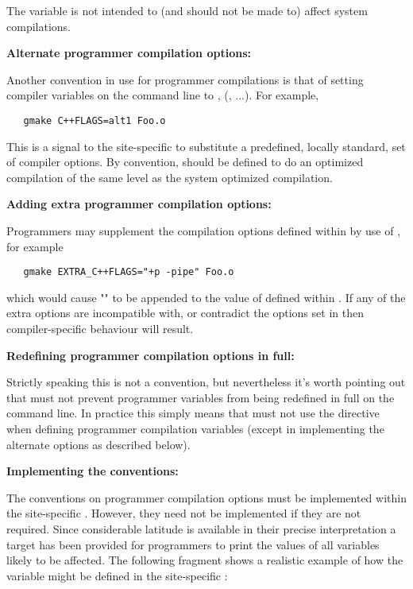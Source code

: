 The  variable is not intended to (and should not be made to) affect
system compilations.
 
\textbf{Alternate programmer compilation options:}
 
Another convention in use for programmer compilations is that of setting
compiler  variables on the command line to ,
(, ...).  For example,
 
\begin{verbatim}
   gmake C++FLAGS=alt1 Foo.o
\end{verbatim}
 
\noindent
This is a signal to the site-specific  to substitute a
predefined, locally standard, set of compiler options.  By convention,
 should be defined to do an optimized compilation of the same level
as the system optimized compilation.
 
\textbf{Adding extra programmer compilation options:}
 
Programmers may supplement the compilation options defined within
 by use of , for example
 
\begin{verbatim}
   gmake EXTRA_C++FLAGS="+p -pipe" Foo.o
\end{verbatim}
 
\noindent
which would cause "" to be appended to the value of
 defined within .  If any of the extra options
are incompatible with, or contradict the options set in  then
compiler-specific behaviour will result.
 
\textbf{Redefining programmer compilation options in full:}
 
Strictly speaking this is not a  convention, but nevertheless
it's worth pointing out that  must not prevent programmer
variables from being redefined in full on the  command line.  In
practice this simply means that  must not use the
 directive when defining programmer compilation variables
(except in implementing the alternate options as described below).
 
\textbf{Implementing the conventions:}
 
The conventions on programmer compilation options must be implemented within
the site-specific .  However, they need not be implemented if
they are not required.  Since considerable latitude is available in their
precise interpretation a  target has been provided for
programmers to print the values of all variables likely to be affected.  The
following fragment shows a realistic example of how the 
variable might be defined in the site-specific :
 
